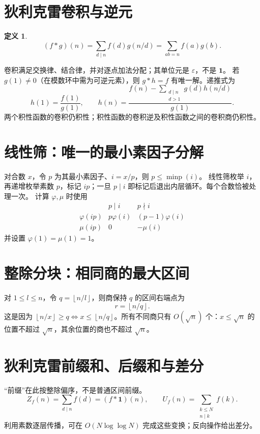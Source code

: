 \documentclass[UTF8,a4paper,11pt,oneside,openany,fontset=fandol]{ctexbook}
\theoremstyle{definition}
\newtheorem{definition}{定义}[chapter]
\newcommand{\eps}{\varepsilon}
\newcommand{\one}{\mathbf 1}
\newcommand{\floor}[1]{\left\lfloor #1\right\rfloor}
\begin{document}
\section{狄利克雷卷积与逆元}
\begin{definition}
\[
 (f*g)(n)=\sum_{d\mid n}f(d)g(n/d)=\sum_{ab=n}f(a)g(b).
\]
\end{definition}
卷积满足交换律、结合律，并对逐点加法分配；其单位元是 $\eps$，不是 $\one$。
若 $g(1)\ne0$（在模数环中需为可逆元素），则 $g*h=f$ 有唯一解。递推式为
\[
 h(1)=\frac{f(1)}{g(1)},\qquad
 h(n)=\frac{f(n)-\sum_{\substack{d\mid n\\d>1}}g(d)h(n/d)}{g(1)}.
\]
两个积性函数的卷积仍积性；积性函数的卷积逆及积性函数之间的卷积商仍积性。



\section{线性筛：唯一的最小素因子分解}
对合数 $x$，令 $p$ 为其最小素因子、$i=x/p$，则 $p\le\operatorname{minp}(i)$。
线性筛枚举 $i$，再递增枚举素数 $p$，标记 $ip$；一旦 $p\mid i$ 即标记后退出内层循环。每个合数恰被处理一次。
计算 $\varphi,\mu$ 时使用
\[
\begin{array}{c|cc}
 &p\mid i&p\nmid i\\\hline
\varphi(ip)&p\varphi(i)&(p-1)\varphi(i)\\
\mu(ip)&0&-\mu(i)
\end{array}
\]
并设置 $\varphi(1)=\mu(1)=1$。



\section{整除分块：相同商的最大区间}
对 $1\le l\le n$，令 $q=\floor{n/l}$，则商保持 $q$ 的区间右端点为
\[
 r=\floor{n/q}.
\]
这是因为 $\floor{n/x}\ge q\iff x\le\floor{n/q}$。所有不同商只有 $O(\sqrt n)$ 个：$x\le\sqrt n$ 的位置不超过 $\sqrt n$，其余位置的商也不超过 $\sqrt n$。


\section{狄利克雷前缀和、后缀和与差分}
“前缀”在此按整除偏序，不是普通区间前缀。
\[
 Z_f(n)=\sum_{d\mid n}f(d)=(f*\one)(n),\qquad
 U_f(n)=\sum_{\substack{k\le N\\n\mid k}}f(k).
\]
利用素数逐层传播，可在 $O(N\log\log N)$ 完成这些变换；反向操作给出差分。
\end{document}
